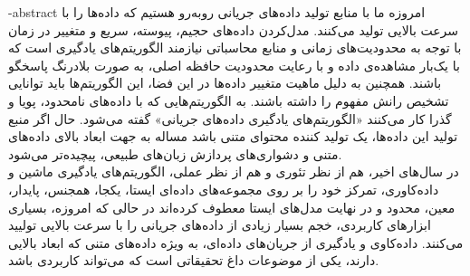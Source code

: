 \fa-abstract{
امروزه ما با منابع تولید داده‌های جریانی روبه‌رو هستیم که داده‌ها را با سرعت بالایی تولید می‌کنند. مدل‌کردن داده‌های حجیم، پیوسته، سریع و متغییر در زمان با توجه به محدودیت‌های زمانی و منابع محاسباتی نیازمند الگوریتم‌های یادگیری است‌ که با یک‌بار مشاهده‌ی داده و با رعایت محدودیت حافظه اصلی، به صورت بلادرنگ پاسخگو باشند. همچنین به دلیل ماهیت متغییر داده‌ها در این فضا، این الگوریتم‌ها باید توانایی تشخیص رانش مفهوم را داشته‌ باشند. به الگوریتم‌هایی که با داده‌های نامحدود، پویا و گذرا کار می‌کنند «الگوریتم‌های یادگیری داده‌های جریانی» گفته می‌شود. حال اگر منبع تولید این داده‌ها، یک تولید کننده محتوای متنی باشد مساله به جهت ابعاد بالای داده‌های متنی و دشواری‌های پردازش زبان‌های طبیعی، پیچیده‌تر می‌شود.
\\
در سال‌های اخیر، هم از نظر تئوری و هم از نظر عملی، الگوریتم‌های یادگیری ماشین و داده‌کاوری، تمرکز خود را بر روی مجموعه‌های داده‌ای ایستا، یکجا، همجنس، پایدار، معین، محدود و در نهایت مدل‌های ایستا معطوف کرده‌اند در حالی که امروزه، بسیاری ابزارهای کاربردی، خجم بسیار زیادی از داده‌های جریانی را با سرعت بالایی تولیید می‌کنند. داده‌کاوی و یادگیری از جریان‌های داده‌ای، به ویژه داده‌های متنی که ابعاد بالایی دارند، یکی از موضوعات داغ تحقیقاتی است که می‌تواند کاربردی باشد.
} 



